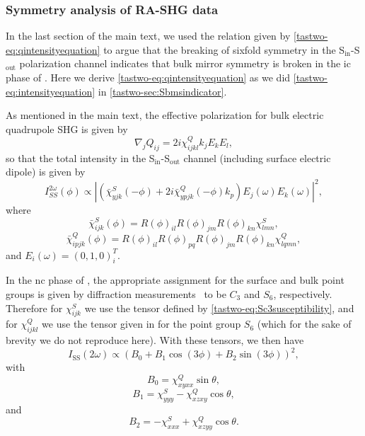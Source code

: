 \subsubsection{Symmetry analysis of RA-SHG data} \label{tastwo-sec:sstwofold}

In the last section of the main text, we used the relation given by \cref{tastwo-eq:qintensityequation} to argue that the breaking of sixfold symmetry in the S$_\mathrm{in}$-S$_\mathrm{out}$ polarization channel indicates that bulk mirror symmetry is broken in the \gls{ic} phase of \tastwo.
Here we derive \cref{tastwo-eq:qintensityequation} as we did \cref{tastwo-eq:intensityequation} in \cref{tastwo-sec:Sbmsindicator}.

As mentioned in the main text, the effective polarization for bulk electric quadrupole SHG is given by~\citep{kumar_magnetic_2017, shen}
\begin{equation}
\nabla_j Q_{ij} = 2i\chi_{ijkl}^Qk_j E_k E_l,
\end{equation}
so that the total intensity in the S$_\mathrm{in}$-S$_\mathrm{out}$ channel (including surface electric dipole) is given by
\begin{equation}
\label{tastwo-eq:SQintensity}
I_{SS}^{2\omega}(\phi) \propto \left|\left(\bar{\chi}^S_{yjk}(-\phi)+2i \bar{\chi}_{ypjk}^Q(-\phi)k_p\right)E_j(\omega)E_k(\omega)\right|^2,
\end{equation}
where
\begin{equation}
\bar{\chi}^S_{ijk}(\phi) = R(\phi)_{il}R(\phi)_{jm}R(\phi)_{kn}\chi^S_{lmn},
\end{equation}
\begin{equation}
\bar{\chi}^Q_{ipjk}(\phi) = R(\phi)_{il}R(\phi)_{pq}R(\phi)_{jm}R(\phi)_{kn}\chi_{lqmn}^Q,
\end{equation}
and $E_i(\omega) = (0, 1, 0)^T_i$.

In the \gls{nc} phase of \tastwo, the appropriate assignment for the surface and bulk point groups is given by diffraction measurements~\citep{spijkerman_x-ray_1997} to be $C_3$ and $S_6$, respectively.
Therefore for $\chi^S_{ijk}$ we use the tensor defined by \cref{tastwo-eq:Sc3susceptibility}, and for $\chi^Q_{ijkl}$ we use the tensor given in \citet{boyd} for the point group $S_6$ (which for the sake of brevity we do not reproduce here).
With these tensors, we then have
\begin{equation}
\label{tastwo-eq:Sequationwithbs}
I_\mathrm{SS}(2\omega) \propto (B_0+B_1\cos{(3\phi)}+B_2\sin{(3\phi)})^2,
\end{equation}
with
\begin{equation}
B_0 = \chi^Q_{xyxx}\sin{\theta},
\end{equation}
\begin{equation}
B_1 = \chi^S_{yyy} -\chi^Q_{xzxy}\cos{\theta},
\end{equation}
and
\begin{equation}
B_2 = -\chi^S_{xxx}+\chi^Q_{xzyy}\cos{\theta}.
\end{equation}

